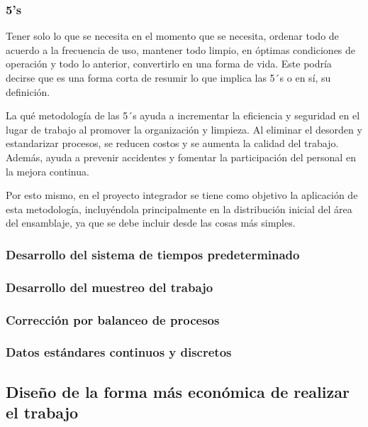     \subsubsection{5's}
    
    Tener solo lo que se necesita en el momento que se necesita, ordenar todo de acuerdo a la frecuencia de uso, mantener todo limpio,  en óptimas condiciones de operación y todo lo anterior, convertirlo en una forma de vida. Este podría decirse que es una forma corta de resumir lo que implica las 5´s o en sí, su definición.
    
    La qué metodología de las 5´s ayuda a incrementar la eficiencia y seguridad en el lugar de trabajo al promover la organización y limpieza. Al eliminar el desorden y estandarizar procesos, se reducen costos y se aumenta la calidad del trabajo. Además, ayuda a  prevenir accidentes y fomentar la participación del personal en la mejora continua. 
    
    
    Por esto mismo, en el proyecto integrador se tiene como objetivo la aplicación  de esta metodología, incluyéndola principalmente en la distribución inicial del área del ensamblaje, ya que se debe incluir desde las cosas más simples.
    
    \subsubsection{Desarrollo del sistema de tiempos predeterminado}
    \subsubsection{Desarrollo del muestreo del trabajo}
    \subsubsection{Corrección por balanceo de procesos}
    \subsubsection{Datos estándares continuos y discretos}
    
    
    \subsection{Diseño de la forma más económica de realizar el trabajo}
    
